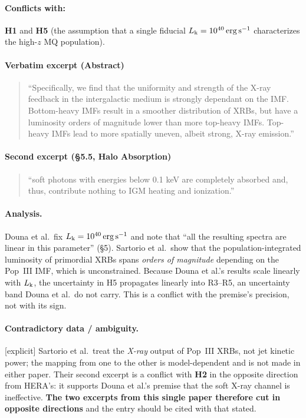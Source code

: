 \documentclass[11pt,a4paper]{article}
\newcommand{\flag}[1]{\textcolor{orange!75!black}{\textsf{\small [#1]}}}
\begin{document}
\paragraph{Conflicts with:} \textbf{H1} and \textbf{H5} (the assumption that a
single fiducial $L_{\rm k}=10^{40}\,{\rm erg\,s^{-1}}$ characterizes the
high-$z$ MQ population).

\paragraph{Verbatim excerpt (Abstract)}
\begin{quote}\small
``Specifically, we find that the uniformity and strength of the X-ray feedback
in the intergalactic medium is strongly dependant on the IMF. Bottom-heavy IMFs
result in a smoother distribution of XRBs, but have a luminosity orders of
magnitude lower than more top-heavy IMFs. Top-heavy IMFs lead to more spatially
uneven, albeit strong, X-ray emission.''
\end{quote}

\paragraph{Second excerpt (\S5.5, Halo Absorption)}
\begin{quote}\small
``soft photons with energies below 0.1 keV are completely absorbed and, thus,
contribute nothing to IGM heating and ionization.''
\end{quote}

\paragraph{Analysis.}
Douna et al.\ fix $L_{\rm k}=10^{40}\,{\rm erg\,s^{-1}}$ and note that ``all the
resulting spectra are linear in this parameter'' (\S5). Sartorio et al.\ show
that the population-integrated luminosity of primordial XRBs spans
\emph{orders of magnitude} depending on the Pop~III IMF, which is unconstrained.
Because Douna et al.'s results scale linearly with $L_{\rm k}$, the
uncertainty in H5 propagates linearly into R3--R5, an uncertainty band Douna
et al.\ do not carry. This is a conflict with the premise's precision, not with
its sign.

\paragraph{Contradictory data / ambiguity.} \flag{explicit}
Sartorio et al.\ treat the \emph{X-ray} output of Pop~III XRBs, not jet kinetic
power; the mapping from one to the other is model-dependent and is not made in
either paper. Their second excerpt is a conflict with \textbf{H2} in the
opposite direction from HERA's: it supports Douna et al.'s premise that the soft
X-ray channel is ineffective. \textbf{The two excerpts from this single paper
therefore cut in opposite directions} and the entry should be cited with that
stated.
\end{document}
